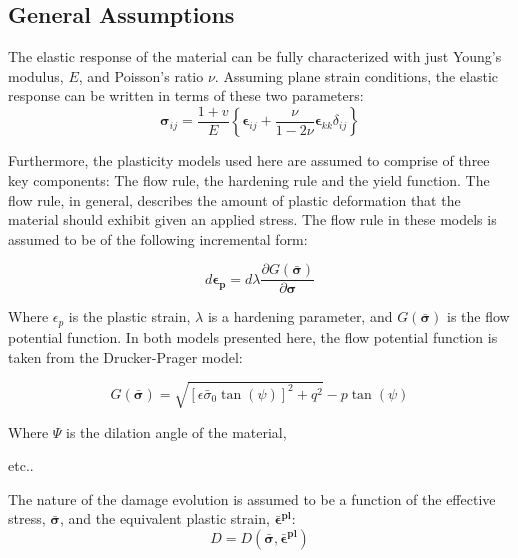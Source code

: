 \subsection{General Assumptions}
The elastic response of the material can be fully characterized with just Young's modulus, $E$, and Poisson's ratio $\nu$. Assuming plane strain conditions, the elastic response can be written in terms of these two parameters:
\begin{equation}
\boldsymbol{\sigma}_{ij}=\frac{1+v}{E}\left\{\boldsymbol{\epsilon}_{ij}+\frac{\nu}{1-2\nu}\boldsymbol{\epsilon}_{kk}\delta_{ij}\right\}
\label{eqn:const8a}
\end{equation}

Furthermore, the plasticity models used here are assumed to comprise of three key components: The flow rule, the hardening rule and the yield function. The flow rule, in general, describes the amount of plastic deformation that the material should exhibit given an applied stress. The flow rule in these models is assumed to be of the following incremental form:

\begin{equation}
d\boldsymbol{\epsilon_p}=d\lambda \frac{\partial G\left(\bar{\boldsymbol{\sigma}}\right)}{\partial \boldsymbol{\sigma}}
\label{eqn:const8b}
\end{equation}

Where $\epsilon_p$ is the plastic strain, $\lambda$ is a hardening parameter, and $G\left(\bar{\boldsymbol{\sigma}}\right)$ is the flow potential function. In both models presented here, the flow potential function is taken from the Drucker-Prager model:

\begin{equation}
G\left(\boldsymbol{\bar{\sigma}}\right)=\sqrt{\left[\epsilon\bar{\sigma}_{0}\tan\left(\psi\right)\right]^{2}+q^{2}}-p\tan\left(\psi\right)\label{eqn:const11}
\end{equation}

Where $\Psi$ is the dilation angle of the material, 


etc..

The nature of the damage evolution is assumed to be a function of the effective stress, $\boldsymbol{\bar{\sigma}}$, and the equivalent plastic strain, $\boldsymbol{\bar{\epsilon}^{pl}}$:
\begin{equation}
D=D(\boldsymbol{\bar{\sigma}},\boldsymbol{\bar{\epsilon}^{pl}})\label{eqn:const8}
\end{equation}



